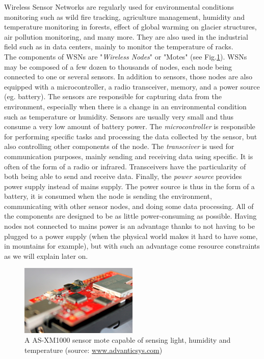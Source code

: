 Wireless Sensor Networks are regularly used for environmental conditions monitoring such as wild fire tracking, agriculture management, humidity and temperature monitoring in forests, effect of global warming on glacier structures, air pollution monitoring, and many more. They are also used in the industrial field such as in data centers, mainly to monitor the temperature of racks.  \\

The components of WSNs are "\textit{Wireless Nodes}" or "Motes" (see Fig.\ref{fig:xm1000}). WSNs may be composed of a few dozen to thousands of nodes, each node being connected to one or several sensors. In addition to sensors, those nodes are also equipped with a microcontroller, a radio transceiver, memory, and a power source (eg. battery). The sensors are responsible for capturing data from the environment, especially when there is a change in an environmental condition such as temperature or humidity.  Sensors are usually very small and thus consume a very low amount of battery power. The \textit{microcontroller} is responsible for performing specific tasks and processing the data collected by the sensor, but also controlling other components of the node. The \textit{transceiver} is used for communication purposes, mainly sending and receiving data using specific. It is often of the form of a radio or infrared. Transceivers have the particularity of both being able to send and receive data. Finally, the \textit{power source} provides power supply instead of mains supply. The power source is thus in the form of a battery, it is consumed when the node is sending the environment, communicating with other sensor nodes, and doing some data processing. All of the components are designed to be as little power-consuming as possible. Having nodes not connected to mains power is an advantage thanks to not having to be plugged to a power supply (when the physical world makes it hard to have some, in mountains for example), but with such an advantage come resource constraints as we will explain later on.\\

\begin{figure}
  \centering
  \includegraphics[width=0.5\textwidth]{res/xm1000.png}
  \caption{A AS-XM1000 sensor mote capable of sensing light, humidity and temperature (source: \url{www.advanticsys.com})}
  \label{fig:xm1000}
\end{figure}

